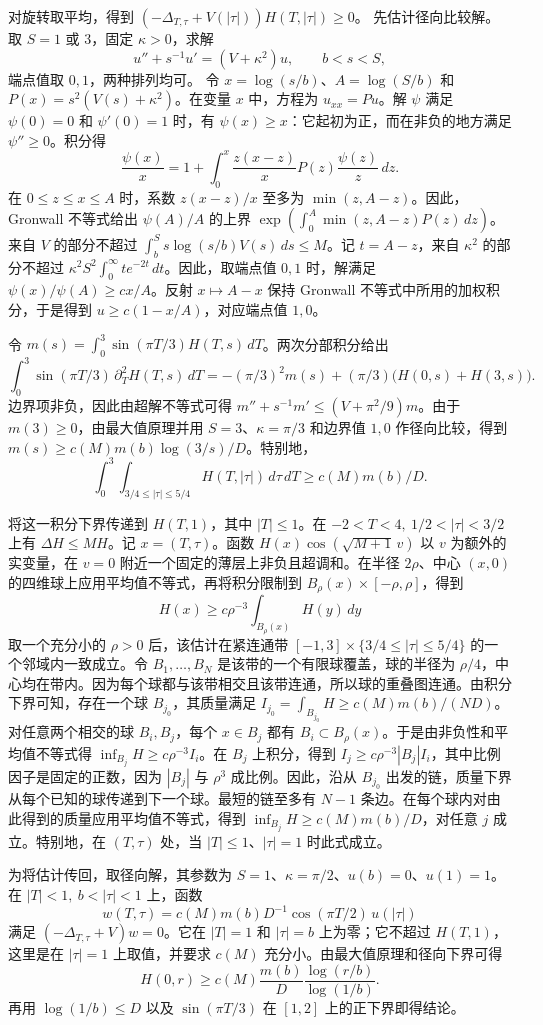对旋转取平均，得到
\((-\Delta_{T,\tau}+V(|\tau|))H(T,|\tau|)\ge0\)。
先估计径向比较解。取 \(S=1\) 或 \(3\)，固定 \(\kappa>0\)，求解
\[
 u''+s^{-1}u'=(V+\kappa^2)u,\qquad b<s<S,
\]
端点值取 \(0,1\)，两种排列均可。
令 \(x=\log(s/b)\)、\(A=\log(S/b)\) 和 \(P(x)=s^2(V(s)+\kappa^2)\)。在变量 \(x\) 中，方程为 \(u_{xx}=Pu\)。解 \(\psi\) 满足 \(\psi(0)=0\) 和 \(\psi'(0)=1\) 时，有 \(\psi(x)\ge x\)：它起初为正，而在非负的地方满足 \(\psi''\ge0\)。积分得
\[
 \frac{\psi(x)}x=1+\int_0^x \frac{z(x-z)}x
                  P(z)\frac{\psi(z)}z\,dz .
\]
在 \(0\le z\le x\le A\) 时，系数 \(z(x-z)/x\) 至多为 \(\min(z,A-z)\)。因此，Gronwall 不等式给出 \(\psi(A)/A\) 的上界
\(\exp(\int_0^A\min(z,A-z)P(z)\,dz)\)。
来自 \(V\) 的部分不超过 \(\int_b^S s\log(s/b)V(s)\,ds\le M\)。记 \(t=A-z\)，来自 \(\kappa^2\) 的部分不超过 \(\kappa^2S^2\int_0^\infty t e^{-2t}\,dt\)。因此，取端点值 \(0,1\) 时，解满足 \(\psi(x)/\psi(A)\ge c x/A\)。反射 \(x\mapsto A-x\) 保持 Gronwall 不等式中所用的加权积分，于是得到 \(u\ge c(1-x/A)\)，对应端点值 \(1,0\)。

令 \(m(s)=\int_0^3\sin(\pi T/3)H(T,s)\,dT\)。两次分部积分给出
\[
 \int_0^3\sin(\pi T/3)\,\partial_T^2H(T,s)\,dT
   =-(\pi/3)^2m(s)+(\pi/3)\big(H(0,s)+H(3,s)\big).
\]
边界项非负，因此由超解不等式可得 \(m''+s^{-1}m'\le(V+\pi^2/9)m\)。由于 \(m(3)\ge0\)，由最大值原理并用 \(S=3\)、\(\kappa=\pi/3\) 和边界值 \(1,0\) 作径向比较，得到 \(m(s)\ge c(M)m(b)\log(3/s)/D\)。特别地，
\[
 \int_0^3\int_{3/4\le|\tau|\le5/4}H(T,|\tau|)\,d\tau\,dT
 \ge c(M)m(b)/D.
\]

将这一积分下界传递到 \(H(T,1)\)，其中 \(|T|\le1\)。在 \(-2<T<4,\ 1/2<|\tau|<3/2\) 上有 \(\Delta H\le MH\)。记 \(x=(T,\tau)\)。函数 \(H(x)\cos(\sqrt{M+1}\,v)\) 以 \(v\) 为额外的实变量，在 \(v=0\) 附近一个固定的薄层上非负且超调和。在半径 \(2\rho\)、中心 \((x,0)\) 的四维球上应用平均值不等式，再将积分限制到 \(B_\rho(x)\times[-\rho,\rho]\)，得到
\[
 H(x)\ge c\rho^{-3}\int_{B_\rho(x)} H(y)\,dy
\]
取一个充分小的 \(\rho>0\) 后，该估计在紧连通带
\([-1,3]\times\{3/4\le|\tau|\le5/4\}\)
的一个邻域内一致成立。令 \(B_1,\ldots,B_N\) 是该带的一个有限球覆盖，球的半径为 \(\rho/4\)，中心均在带内。因为每个球都与该带相交且该带连通，所以球的重叠图连通。由积分下界可知，存在一个球 \(B_{j_0}\)，其质量满足 \(I_{j_0}=\int_{B_{j_0}}H\ge c(M)m(b)/(ND)\)。对任意两个相交的球 \(B_i,B_j\)，每个 \(x\in B_j\) 都有 \(B_i\subset B_\rho(x)\)。于是由非负性和平均值不等式得 \(\inf_{B_j}H\ge c\rho^{-3}I_i\)。在 \(B_j\) 上积分，得到 \(I_j\ge c\rho^{-3}|B_j|I_i\)，其中比例因子是固定的正数，因为 \(|B_j|\) 与 \(\rho^3\) 成比例。因此，沿从 \(B_{j_0}\) 出发的链，质量下界从每个已知的球传递到下一个球。最短的链至多有 \(N-1\) 条边。在每个球内对由此得到的质量应用平均值不等式，得到 \(\inf_{B_j}H\ge c(M)m(b)/D\)，对任意 \(j\) 成立。特别地，在 \((T,\tau)\) 处，当 \(|T|\le1\)、\(|\tau|=1\) 时此式成立。

为将估计传回，取径向解，其参数为 \(S=1\)、\(\kappa=\pi/2\)、\(u(b)=0\)、\(u(1)=1\)。在 \(|T|<1,\ b<|\tau|<1\) 上，函数
\[
 w(T,\tau)=c(M)m(b)D^{-1}\cos(\pi T/2)\,u(|\tau|)
\]
满足 \((-\Delta_{T,\tau}+V)w=0\)。它在 \(|T|=1\) 和 \(|\tau|=b\) 上为零；它不超过 \(H(T,1)\)，这里是在 \(|\tau|=1\) 上取值，并要求 \(c(M)\) 充分小。由最大值原理和径向下界可得
\[
 H(0,r)\ge c(M)\frac{m(b)}D
              \frac{\log(r/b)}{\log(1/b)}.
\]
再用 \(\log(1/b)\le D\) 以及 \(\sin(\pi T/3)\) 在 \([1,2]\) 上的正下界即得结论。
